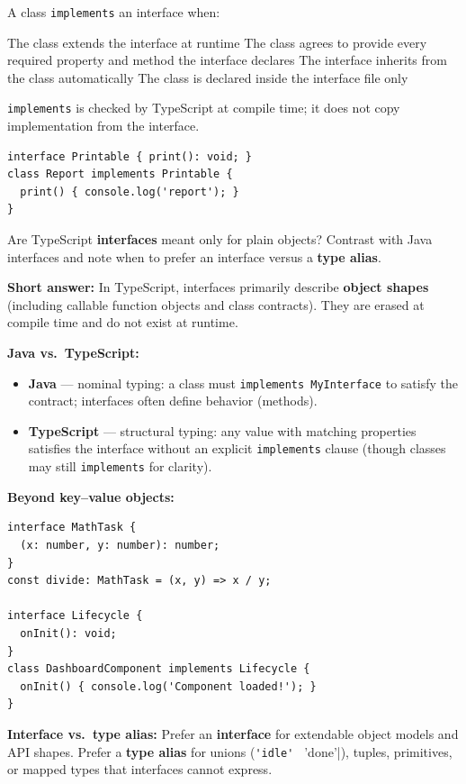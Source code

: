 \question[4]
A class \lstinline[style=tsinline]|implements| an interface when:
\begin{choices}
  \choice The class extends the interface at runtime
  \CorrectChoice The class agrees to provide every required property and method the interface declares
  \choice The interface inherits from the class automatically
  \choice The class is declared inside the interface file only
\end{choices}
\begin{solution}
  \lstinline[style=tsinline]|implements| is checked by TypeScript at compile time; it does not copy implementation from the interface.
\begin{lstlisting}[style=ts]
interface Printable { print(): void; }
class Report implements Printable {
  print() { console.log('report'); }
}
\end{lstlisting}
\end{solution}

\question[6]
Are TypeScript \textbf{interfaces} meant only for plain objects? Contrast with Java interfaces and note when to prefer an interface versus a \textbf{type alias}.
\begin{solutionorbox}[5.25in]
\textbf{Short answer:} In TypeScript, interfaces primarily describe \textbf{object shapes} (including callable function objects and class contracts). They are erased at compile time and do not exist at runtime.

\textbf{Java vs.\ TypeScript:}
\begin{itemize}
  \item \textbf{Java} --- nominal typing: a class must \lstinline[style=javainline]|implements MyInterface| to satisfy the contract; interfaces often define behavior (methods).
  \item \textbf{TypeScript} --- structural typing: any value with matching properties satisfies the interface without an explicit \lstinline[style=tsinline]|implements| clause (though classes may still \lstinline[style=tsinline]|implements| for clarity).
\end{itemize}

\textbf{Beyond key--value objects:}
\begin{lstlisting}[style=ts]
interface MathTask {
  (x: number, y: number): number;
}
const divide: MathTask = (x, y) => x / y;

interface Lifecycle {
  onInit(): void;
}
class DashboardComponent implements Lifecycle {
  onInit() { console.log('Component loaded!'); }
}
\end{lstlisting}

\textbf{Interface vs.\ type alias:} Prefer an \textbf{interface} for extendable object models and API shapes. Prefer a \textbf{type alias} for unions (\lstinline[style=tsinline]|'idle' | 'done'|), tuples, primitives, or mapped types that interfaces cannot express.
\end{solutionorbox}



